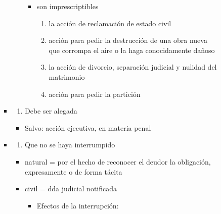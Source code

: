 \documentclass[]{article}
\providecommand{\tightlist}{%
  \setlength{\itemsep}{0pt}\setlength{\parskip}{0pt}}
\begin{document}
\begin{itemize}
\begin{itemize}
\begin{itemize}
\begin{itemize}
\begin{enumerate}
          \begin{itemize}
          \tightlist
          \item
            son imprescriptibles

            \begin{enumerate}
            \def\labelenumii{\arabic{enumii}.}
            \tightlist
            \item
              la acción de reclamación de estado civil
            \item
              acción para pedir la destrucción de una obra nueva que
              corrompa el aire o la haga conocidamente dañoso
            \item
              la acción de divorcio, separación judicial y nulidad del
              matrimonio
            \item
              acción para pedir la partición
            \end{enumerate}
          \end{itemize}
        \end{enumerate}
      \item
        \begin{enumerate}
        \def\labelenumi{\Alph{enumi})}
        \setcounter{enumi}{1}
        \tightlist
        \item
          Debe ser alegada
        \end{enumerate}

        \begin{itemize}
        \tightlist
        \item
          Salvo: acción ejecutiva, en materia penal
        \end{itemize}
      \item
        \begin{enumerate}
        \def\labelenumi{\Alph{enumi})}
        \setcounter{enumi}{2}
        \tightlist
        \item
          Que no se haya interrumpido
        \end{enumerate}

        \begin{itemize}
        \item
          natural = por el hecho de reconocer el deudor la obligación,
          expresamente o de forma tácita
        \item
          civil = dda judicial notificada

          \begin{itemize}
          \tightlist
          \item
            Efectos de la interrupción:


\end{itemize}
\end{itemize}
\end{itemize}
\end{itemize}
\end{itemize}
\end{itemize}
\end{document}
